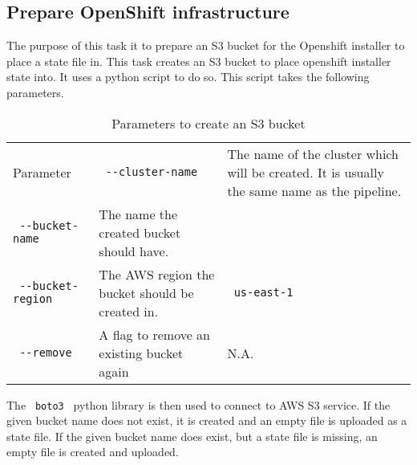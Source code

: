 \subsection{Prepare OpenShift infrastructure}\label{subsec:prepare-openshift-infrastructure}

The purpose of this task it to prepare an S3 bucket for the Openshift installer to place a state file in.
This task creates an S3 bucket to place openshift installer state into.
It uses a python script to do so.
This script takes the following parameters.

\begin{table}
    \centering
    \caption{Parameters to create an S3 bucket}
    \label{tab:parameters-to-create-an-s3-bucket}
    \begin{tabular}{| p | p | p |}
        Parameter &
        \hline
        \verb| --cluster-name | & The name of the cluster which will be created. It is usually the same name as the pipeline. & \\
        \verb| --bucket-name | & The name the created bucket should have. & \\
        \verb| --bucket-region | & The AWS region the bucket should be created in. & \verb| us-east-1 | \\
        \verb| --remove | & A flag to remove an existing bucket again & N.A. \\
    \end{tabular}
\end{table}

The \verb| boto3 | python library is then used to connect to AWS S3 service.
If the given bucket name does not exist, it is created and an empty file is uploaded as a state file.
If the given bucket name does exist, but a state file is missing, an empty file is created and uploaded.
